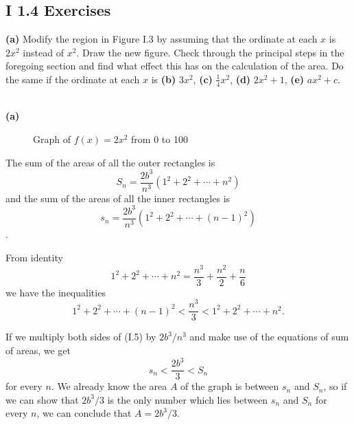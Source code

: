 \subsection*{I 1.4 Exercises}


\begin{exercise}
  \textbf{(a)} Modify the region in Figure I.3 by assuming that the ordinate at each $x$  is $2x^2$ instead of $x^2$.
  Draw the new figure. Check through the principal steps in the foregoing section and 
  find what effect this has on the calculation of the area. Do the same if the ordinate
  at each $x$ is \textbf{(b)} $3x^2$, \textbf{(c)} $\frac{1}{4}x^2$, \textbf{(d)} $2x^2 + 1$, \textbf{(e)} $ax^2 + c$.
\end{exercise}

\begin{solution}{\ \\}
  \textbf{(a)}
  \begin{figure}[H]
    \centering
    \caption*{Graph of $f(x)=2x^2$ from 0 to 100}
  \end{figure}
  The sum of the areas of all the outer rectangles is
  \[
  S_n = \frac{2b^3}{n^3} \left( 1^2 + 2^2 + \cdots + n^2 \right) 
  \]
  and the sum of the areas of all the inner rectangles is
  \[
  s_n = \frac{2b^3}{n^3} \left( 1^2 + 2^2 + \cdots + (n-1)^2 \right)
  \].

  From identity
  \[
  \tag{I.3} 1^2 + 2^2 + \cdots + n^2 = \frac{n^3}{3} + \frac{n^2}{2} + \frac{n}{6}
  \]
  we have the inequalities
  \[
  \tag{I.5} 1^2 + 2^2 + \cdots + (n-1)^2 < \frac{n^3}{3} < 1^2 + 2^2 + \cdots + n^2.
  \]

  
  If we multiply both sides of (I.5) by $2b^3/n^3$ and make use of the equations of sum of areas, we get
  \[
  s_n < \frac{2b^3}{3} < S_n \tag{1}
  \]
  for every $n$. We already know the area $A$ of the graph is between $s_n$ and $S_n$, so if we can 
  show that $2b^3/3$ is the only number which lies between $s_n$ and $S_n$ for every $n$, we can conclude that $A = 2b^3/3$.


\end{solution}
